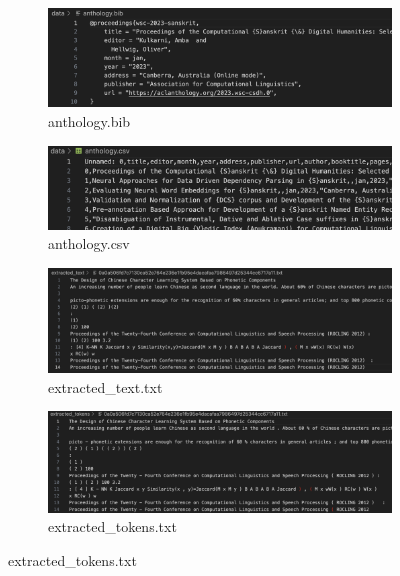 \documentclass[11pt]{article}
\begin{document}
\begin{figure}[ht]
    \begin{subfigure}{0.5\textwidth} %
        \centering
        \includegraphics[width=1.0\textwidth]{images/anthology_bib.png}
        \caption{anthology.bib}
        \label{fig:anthologybib}
    \end{subfigure}
    \begin{subfigure}{0.5\textwidth} %
        \centering
        \includegraphics[width=1.0\textwidth]{images/anthology_csv.png}
        \caption{anthology.csv}
        \label{fig:anthologycsv}
    \end{subfigure}
    \begin{subfigure}{0.5\textwidth} %
        \centering
        \includegraphics[width=1.0\textwidth]{images/extracted_text.png}
        \caption{extracted\_text.txt}
        \label{fig:extractedtext}
    \end{subfigure}
    \begin{subfigure}{0.5\textwidth} %
        \centering
        \includegraphics[width=1.0\textwidth]{images/extracted_tokens.png}
        \caption{extracted\_tokens.txt}
        \label{fig:extractedtokens}
    \end{subfigure}
    \label{fig:overall}
\end{figure}
\end{document}
